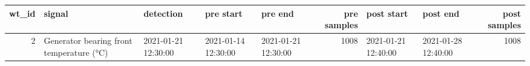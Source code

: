 \begin{tabular}{rllllrllr}
\toprule
wt\_id & signal & detection & pre start & pre end & pre samples & post start & post end & post samples \\
\midrule
2 & Generator bearing front temperature (°C) & 2021-01-21 12:30:00 & 2021-01-14 12:30:00 & 2021-01-21 12:30:00 & 1008 & 2021-01-21 12:40:00 & 2021-01-28 12:40:00 & 1008 \\
\bottomrule
\end{tabular}
